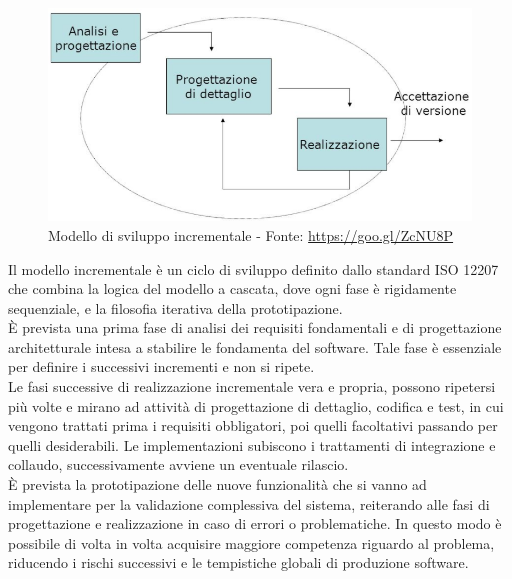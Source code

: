 	\begin{figure}[H]
		\centering
	   	\includegraphics[width=1\textwidth]{immagini/ModelloIncrementale}
	   	\caption{Modello di sviluppo incrementale - Fonte: \url{https://goo.gl/ZcNU8P}}
	\end{figure}
	
	Il modello incrementale è un ciclo di sviluppo definito dallo standard ISO 12207 che combina la logica del modello a cascata, dove ogni fase è rigidamente sequenziale, e la filosofia iterativa della prototipazione.\\
	
	È prevista una prima fase di analisi dei requisiti fondamentali e di progettazione architetturale intesa a stabilire le fondamenta del software. Tale fase è essenziale per definire i successivi incrementi e non si ripete.\\
	
	Le fasi successive di realizzazione incrementale vera e propria, possono ripetersi più volte e mirano ad attività di progettazione di dettaglio, codifica e test, in cui vengono trattati prima i requisiti obbligatori, poi quelli facoltativi passando per quelli desiderabili. Le implementazioni subiscono i trattamenti di integrazione e collaudo, successivamente avviene un eventuale rilascio.\\

	È prevista la prototipazione delle nuove funzionalità che si vanno ad implementare per la validazione complessiva del sistema, reiterando 
	alle fasi di progettazione e realizzazione in caso di errori o problematiche. In questo modo è possibile di volta in volta acquisire maggiore competenza riguardo al problema, riducendo i rischi successivi e le tempistiche globali di produzione software.
	
